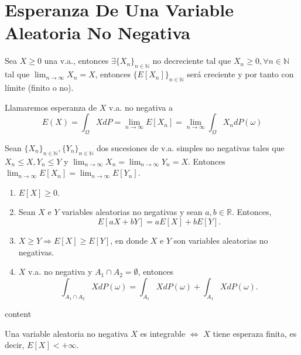 \section{Esperanza De Una Variable Aleatoria No Negativa}

\begin{prop}
  Sea $X \geq 0$ una v.a., entonces $\exists \{ X_{n} \}_{n \in \mathbb{N}}$ no decreciente tal que $X_{n} \geq 0, \forall n \in \mathbb{N}$ tal que $\lim_{n \to \infty} X_{n} = X$, entonces $\{ E[X_{n}] \}_{n \in \mathbb{N}}$ será creciente y por tanto con límite (finito o no).
\end{prop}

\begin{defn}
  Llamaremos esperanza de $X$ v.a. no negativa a
  \[ 
    E(X) = \int_{\Omega}^{} X dP = \lim_{n \to \infty} E[X_{n}] = \lim_{n \to \infty} \int_{\Omega}^{} X_{n} dP(\omega)
  \] 
\end{defn}

\begin{prop}
  Sean $\{ X_{n} \}_{n \in \mathbb{N}}, \{ Y_{n} \}_{n \in \mathbb{N}}$ dos sucesiones de v.a. simples no negativas tales que $X_{n} \leq X, Y_{n} \leq Y$ y $\lim_{n \to \infty} X_{n} = \lim_{n \to \infty} Y_{n} = X $. Entonces $\lim_{n \to \infty} E[X_{n}] = \lim_{n \to \infty} E[Y_{n}]$.
\end{prop}

\begin{prop}[Propiedades]
  \begin{enumerate}[label=(\roman*)]
    \item $E[X] \geq 0$.
    \item Sean $X$ e $Y$ variables aleatorias no negativas y sean $a, b \in \mathbb{R}$. Entonces,
      \[
        E[aX + bY] = a E[X] + b E [ Y ].
      \]
    \item $X \geq Y \Rightarrow E[X] \geq E[Y]$, en donde $X$ e $Y$ son variables aleatorias no negativas.
    \item $X$ v.a. no negativa y $A_{1} \cap A_{2} = \emptyset$, entonces
      \[ 
        \int_{A_{1} \cap A_{2}}^{} X dP(\omega) = \int_{A_{1}}^{} X dP(\omega) + \int_{A_{1}}^{} X dP(\omega).
      \] 
  \end{enumerate}
\end{prop}

\begin{dem}
  content
\end{dem}

\begin{defn}
  Una variable aleatoria no negativa $X$ es integrable $\Leftrightarrow$ $X$ tiene esperaza finita, es decir, $E[X] < +\infty$.
\end{defn}

